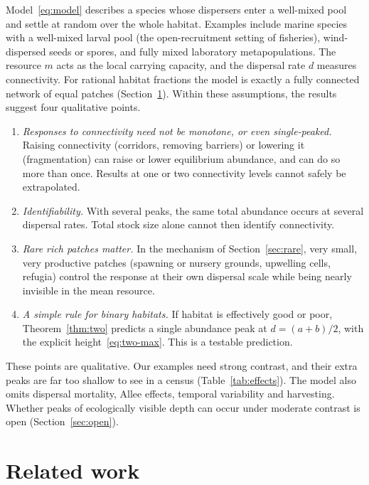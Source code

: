 \documentclass[11pt]{article}
\theoremstyle{remark}
\begin{document}
Model~\eqref{eq:model} describes a species whose dispersers enter a
well-mixed pool and settle at random over the whole habitat. Examples
include marine species with a well-mixed larval pool (the open-recruitment
setting of fisheries), wind-dispersed seeds or spores, and fully mixed
laboratory metapopulations. The resource \(m\) acts as the local carrying
capacity, and the dispersal rate \(d\) measures connectivity. For rational
habitat fractions the model is exactly a fully connected network of equal
patches (Section~\ref{sec:related}). Within these assumptions, the results
suggest four qualitative points.
\begin{enumerate}
 \item \emph{Responses to connectivity need not be monotone, or even
 single-peaked.} Raising connectivity (corridors, removing barriers) or
 lowering it (fragmentation) can raise or lower equilibrium abundance, and
 can do so more than once. Results at one or two connectivity levels cannot
 safely be extrapolated.
 \item \emph{Identifiability.} With several peaks, the same total
 abundance occurs at several dispersal rates. Total stock size alone cannot
 then identify connectivity.
 \item \emph{Rare rich patches matter.} In the mechanism of
 Section~\ref{sec:rare}, very small, very productive patches (spawning or
 nursery grounds, upwelling cells, refugia) control the response at their
 own dispersal scale while being nearly invisible in the mean resource.
 \item \emph{A simple rule for binary habitats.} If habitat is effectively
 good or poor, Theorem~\ref{thm:two} predicts a single abundance peak at
 \(d=(a+b)/2\), with the explicit height~\eqref{eq:two-max}. This is a
 testable prediction.
\end{enumerate}
These points are qualitative. Our examples need strong contrast, and their
extra peaks are far too shallow to see in a census
(Table~\ref{tab:effects}). The model also omits dispersal mortality, Allee
effects, temporal variability and harvesting. Whether peaks of
ecologically visible depth can occur under moderate contrast is open
(Section~\ref{sec:open}).

\section{Related work}\label{sec:related}
\end{document}
